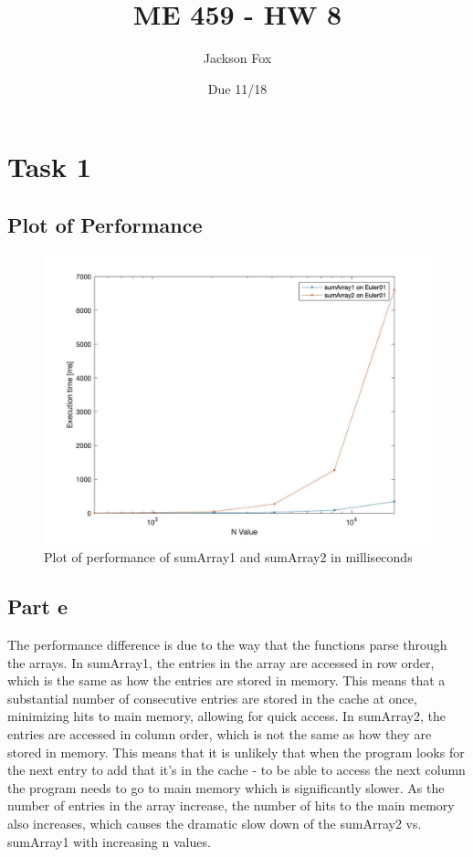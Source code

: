 \documentclass[11pt, oneside]{article}   	%
\title{ME 459 - HW 8}
\author{Jackson Fox}
\date{Due 11/18}							%
\begin{document}
\maketitle
\section*{Task 1}
\subsection*{Plot of Performance}
		\begin{figure} [h]
			\centering
			\includegraphics[width=150mm]{Task1.jpg}
			\caption{Plot of performance of sumArray1 and sumArray2 in milliseconds}
		\end{figure}
\subsection*{Part e}
The performance difference is due to the way that the functions parse through the arrays.  In sumArray1, the entries in the array are accessed in row order, which is the same as how the entries are stored in memory.  This means that a substantial number of consecutive entries are stored in the cache at once, minimizing hits to main memory, allowing for quick access.  In sumArray2, the entries are accessed in column order, which is not the same as how they are stored in memory.  This means that it is unlikely that when the program looks for the next entry to add that it's in the cache - to be able to access the next column the program needs to go to main memory which is significantly slower.  As the number of entries in the array increase, the number of hits to the main memory also increases, which causes the dramatic slow down of the sumArray2 vs. sumArray1 with increasing n values.
\end{document}

